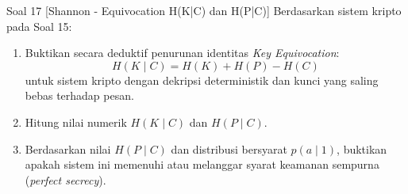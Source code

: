 \documentclass[11pt,a4paper]{article}
\begin{document}
\begin{soalshannon}{Soal 17 [Shannon - Equivocation H(K|C) dan H(P|C)]}
Berdasarkan sistem kripto pada Soal 15:
\begin{enumerate}[label=(\alph*)]
    \item Buktikan secara deduktif penurunan identitas \textit{Key Equivocation}:
    \[
    H(K \mid C) = H(K) + H(P) - H(C)
    \]
    untuk sistem kripto dengan dekripsi deterministik dan kunci yang saling bebas terhadap pesan.
    \item Hitung nilai numerik $H(K \mid C)$ dan $H(P \mid C)$.
    \item Berdasarkan nilai $H(P \mid C)$ dan distribusi bersyarat $p(a \mid 1)$, buktikan apakah sistem ini memenuhi atau melanggar syarat keamanan sempurna (\textit{perfect secrecy}).
\end{enumerate}
\end{soalshannon}
\end{document}
